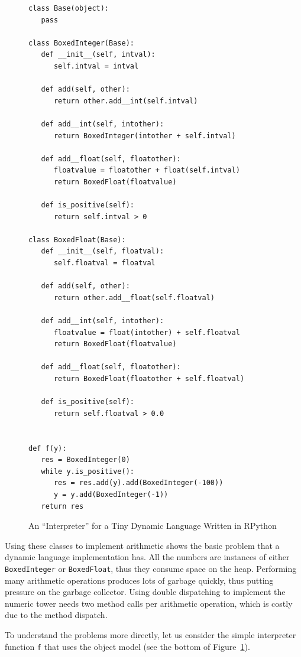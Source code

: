 \documentclass{sigplanconf}
\begin{document}
\begin{figure}
\begin{lstlisting}[mathescape]
class Base(object):
   pass

class BoxedInteger(Base):
   def __init__(self, intval):
      self.intval = intval

   def add(self, other):
      return other.add__int(self.intval)

   def add__int(self, intother):
      return BoxedInteger(intother + self.intval)

   def add__float(self, floatother):
      floatvalue = floatother + float(self.intval)
      return BoxedFloat(floatvalue)

   def is_positive(self):
      return self.intval > 0

class BoxedFloat(Base):
   def __init__(self, floatval):
      self.floatval = floatval

   def add(self, other):
      return other.add__float(self.floatval)

   def add__int(self, intother):
      floatvalue = float(intother) + self.floatval
      return BoxedFloat(floatvalue)

   def add__float(self, floatother):
      return BoxedFloat(floatother + self.floatval)

   def is_positive(self):
      return self.floatval > 0.0


def f(y):
   res = BoxedInteger(0)
   while y.is_positive():
      res = res.add(y).add(BoxedInteger(-100))
      y = y.add(BoxedInteger(-1))
   return res
\end{lstlisting}
\caption{An ``Interpreter'' for a Tiny Dynamic Language Written in RPython}
\label{fig:objmodel}
\end{figure}

Using these classes to implement arithmetic shows the basic problem that a
dynamic language implementation has. All the numbers are instances of either
\lstinline{BoxedInteger} or \lstinline{BoxedFloat}, thus they consume space on the
heap. Performing many arithmetic operations produces lots of garbage quickly,
thus putting pressure on the garbage collector. Using double dispatching to
implement the numeric tower needs two method calls per arithmetic operation,
which is costly due to the method dispatch.

To understand the problems more directly, let us consider the simple
interpreter function \lstinline{f} that uses the object model (see the bottom of
Figure~\ref{fig:objmodel}).
\end{document}
